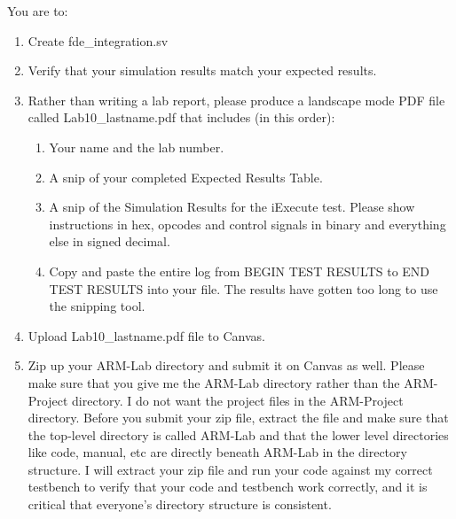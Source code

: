 You are to:
\begin{enumerate}
\item Create fde\_integration.sv
\item Verify that your simulation results match your expected results.
\item Rather than writing a lab report, please produce a landscape mode PDF file called Lab10\_lastname.pdf that includes (in this order):
\begin{enumerate}
	\item Your name and the lab number.
	\item A snip of your completed Expected Results Table.
	\item A snip of the Simulation Results for the iExecute test.  Please show instructions in hex, opcodes and control signals in binary and everything else in signed decimal.  
	\item Copy and paste the entire log from BEGIN TEST RESULTS to END TEST RESULTS into your file.  The results have gotten too long to use the snipping tool.	
\end{enumerate}
\item Upload Lab10\_lastname.pdf file to Canvas.
\item Zip up your ARM-Lab directory and submit it on Canvas as well.  Please make sure that you give me the ARM-Lab directory rather than the ARM-Project directory.  I do not want the project files in the ARM-Project directory.  Before you submit your zip file, extract the file and make sure that the top-level directory is called ARM-Lab and that the lower level directories like code, manual, etc are directly beneath ARM-Lab in the directory structure.  I will extract your zip file and run your code against my correct testbench to verify that your code and testbench work correctly, and it is critical that everyone's directory structure is consistent.
\end{enumerate}